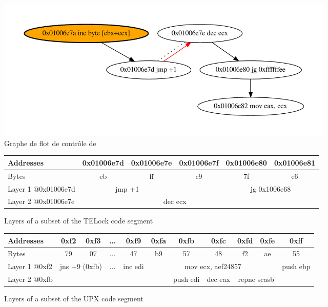 \begin{figure}
\begin{center}
\includegraphics[width=0.8\textwidth]{supports/disasm/telock/telock.pdf}
\end{center}
\caption{Graphe de flot de contrôle de \telock}
\label{fig:telock_cfg}
\end{figure}

\begin{figure}
\begin{center}
\begin{tabular}{|l|c|c|c|c|c|}
\hline
Addresses & 0x01006e7d & 0x01006e7e & 0x01006e7f & 0x01006e80 & 0x01006e81\\
\hline
Bytes & eb & ff & c9 & 7f & e6\\
\hline
Layer 1 @0x01006e7d & \multicolumn{2}{c|}{jmp +1} & \cellcolor[gray]{0.0} & \multicolumn{2}{c|}{jg 0x1006e68}\\
\hline
Layer 2 @0x01006e7e & \cellcolor[gray]{0.0} & \multicolumn{2}{c|}{dec ecx} & \multicolumn{2}{c|}{\cellcolor[gray]{0.0}} \\
 \hline
\end{tabular}
\end{center}
\caption{Layers of a subset of the TELock code segment}
\label{fig:telock-layers-recursive}
\end{figure}

\begin{figure}
\begin{center}
\begin{tabular}{|l|c|c|c|c|c|c|c|c|c|c|}
\hline
Addresses & 0xf2 & 0xf3 & ... & 0xf9 & 0xfa & 0xfb & 0xfc & 0xfd & 0xfe & 0xff\\
\hline
Bytes & 79 & 07 & ... & 47 & b9 & 57 & 48 & f2 & ae & 55\\
\hline
Layer 1 @0xf2 & \multicolumn{2}{c|}{jns +9 (0xfb)} & ... & inc edi & \multicolumn{5}{c|}{mov ecx, aef24857} & push ebp\\
\hline
Layer 2 @0xfb & \multicolumn{5}{c|}{\cellcolor[gray]{0.0}} & push edi & dec eax & \multicolumn{2}{c|}{repne scasb} & \cellcolor[gray]{0.0}\\
\hline
\end{tabular}
\end{center}
\caption{Layers of a subset of the UPX code segment}
\label{fig:upx-layers-recursive}
\end{figure}

